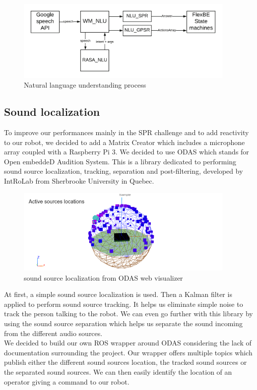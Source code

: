 \documentclass[runningheads,a4paper]{llncs}
\begin{document}
\begin{figure}
  \centering
  \includegraphics[width=300pt]{images/wm_nlu.png}
  \caption{Natural language understanding process}
\end{figure} 

\subsection{Sound localization}
\tab To improve our performances mainly in the SPR challenge and to add reactivity to our robot, we decided to add a Matrix Creator which includes a microphone array coupled with a Raspberry Pi 3. We decided to use ODAS  \cite{odas} which stands for Open embeddeD Audition System. This is a library dedicated to performing sound source localization, tracking, separation and post-filtering, developed by IntRoLab\cite{Introlab} from Sherbrooke University in Quebec.\\ 

\begin{figure}
  \centering
  \includegraphics[width=300pt]{images/odas.png}
  \caption{ sound source localization from ODAS web visualizer \cite{odas}}
\end{figure} 

At first, a simple sound source localization is used. Then a Kalman filter is applied to perform sound source tracking. It helps us eliminate simple noise to track the person talking to the robot. We can even go further with this library by using the sound source separation which helps us separate the sound incoming from the different audio sources.\\

We decided to build our own ROS wrapper around ODAS considering the lack of documentation surrounding the project. Our wrapper offers multiple topics which publish either the different sound sources location, the tracked sound sources or the separated sound sources. We can then easily identify the location of an operator giving a command to our robot.\\
\end{document}
